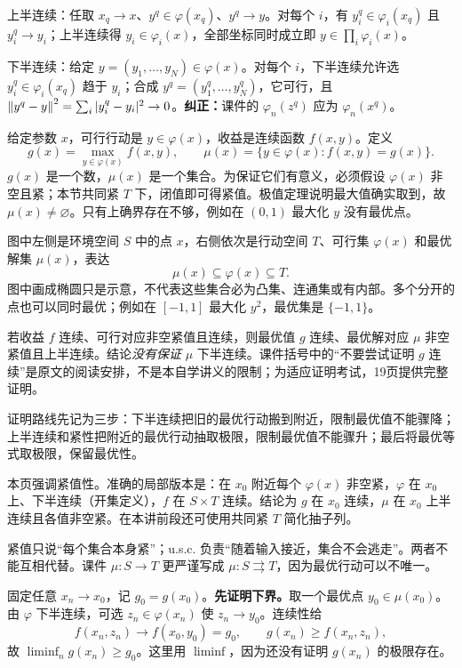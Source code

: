 上半连续：任取 $x_q\to x$、$y^q\in\varphi(x_q)$、$y^q\to y$。对每个 $i$，有 $y_i^q\in\varphi_i(x_q)$ 且 $y_i^q\to y_i$；上半连续得 $y_i\in\varphi_i(x)$，全部坐标同时成立即 $y\in\prod_i\varphi_i(x)$。

下半连续：给定 $y=(y_1,\ldots,y_N)\in\varphi(x)$。对每个 $i$，下半连续允许选 $y_i^q\in\varphi_i(x_q)$ 趋于 $y_i$；合成 $y^q=(y_1^q,\ldots,y_N^q)$，它可行，且 $\left\lVert y^q-y\right\rVert^2=\sum_i|y_i^q-y_i|^2\to0$。\textbf{纠正：}课件的 $\varphi_n(z^q)$ 应为 $\varphi_n(x^q)$。

给定参数 $x$，可行行动是 $y\in\varphi(x)$，收益是连续函数 $f(x,y)$。定义
\[g(x)=\max_{y\in\varphi(x)}f(x,y),\qquad
\mu(x)=\{y\in\varphi(x):f(x,y)=g(x)\}.\]
$g(x)$ 是一个数，$\mu(x)$ 是一个集合。为保证它们有意义，必须假设 $\varphi(x)$ 非空且紧；本节共同紧 $T$ 下，闭值即可得紧值。极值定理说明最大值确实取到，故 $\mu(x)\ne\varnothing$。只有上确界存在不够，例如在 $(0,1)$ 最大化 $y$ 没有最优点。

图中左侧是环境空间 $S$ 中的点 $x$，右侧依次是行动空间 $T$、可行集 $\varphi(x)$ 和最优解集 $\mu(x)$，表达
\[\mu(x)\subseteq\varphi(x)\subseteq T.\]
图中画成椭圆只是示意，不代表这些集合必为凸集、连通集或有内部。多个分开的点也可以同时最优；例如在 $[-1,1]$ 最大化 $y^2$，最优集是 $\{-1,1\}$。

若收益 $f$ 连续、可行对应非空紧值且连续，则最优值 $g$ 连续、最优解对应 $\mu$ 非空紧值且上半连续。结论\emph{没有保证} $\mu$ 下半连续。课件括号中的“不要尝试证明 $g$ 连续”是原文的阅读安排，不是本自学讲义的限制；为适应证明考试，19页提供完整证明。

证明路线先记为三步：下半连续把旧的最优行动搬到附近，限制最优值不能骤降；上半连续和紧性把附近的最优行动抽取极限，限制最优值不能骤升；最后将最优等式取极限，保留最优性。

本页强调紧值性。准确的局部版本是：在 $x_0$ 附近每个 $\varphi(x)$ 非空紧，$\varphi$ 在 $x_0$ 上、下半连续（开集定义），$f$ 在 $S\times T$ 连续。结论为 $g$ 在 $x_0$ 连续，$\mu$ 在 $x_0$ 上半连续且各值非空紧。在本讲前段还可使用共同紧 $T$ 简化抽子列。

紧值只说“每个集合本身紧”；u.s.c. 负责“随着输入接近，集合不会逃走”。两者不能互相代替。课件 $\mu:S\to T$ 更严谨写成 $\mu:S\rightrightarrows T$，因为最优行动可以不唯一。

固定任意 $x_n\to x_0$，记 $g_0=g(x_0)$。\textbf{先证明下界。}取一个最优点 $y_0\in\mu(x_0)$。由 $\varphi$ 下半连续，可选 $z_n\in\varphi(x_n)$ 使 $z_n\to y_0$。连续性给
\[f(x_n,z_n)\to f(x_0,y_0)=g_0,\qquad g(x_n)\ge f(x_n,z_n),\]
故 $\liminf_n g(x_n)\ge g_0$。这里用 $\liminf$，因为还没有证明 $g(x_n)$ 的极限存在。

